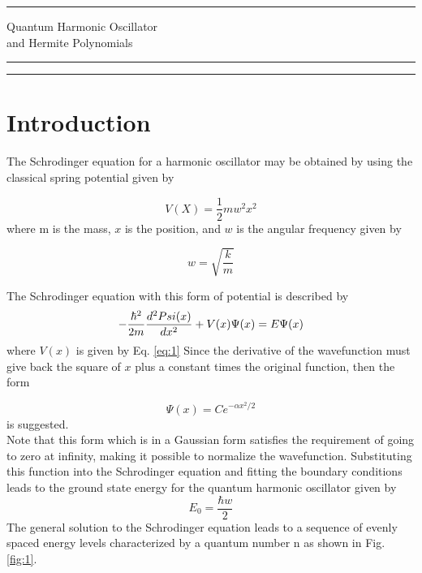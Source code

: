 \documentclass{article}
\begin{document}
\hrule
\begin{center}
\large {Quantum Harmonic Oscillator}\\ \large{and Hermite Polynomials}
\end{center}

\hrule
\vspace{1pt}
\hrule height 1pt

\section{Introduction}
The Schrodinger equation for a harmonic oscillator may be obtained by using the classical spring potential
given by

\begin{equation}
\label{eq:1}
V(X) = \frac{1}{2}mw^2x^2
\end{equation}
where m is the mass, $x$ is the position, and $w$ is the angular frequency given by

\begin{equation}
\label{eq:2}
w = \sqrt{\frac{k}{m}}
\end{equation}

\noindent
The Schrodinger equation with this form of potential is described by
\begin{equation}
\label{eq:3}
-\frac{\hbar^2}{2m} 
\frac{d^2\\Psi(x)}{dx^2} + V(x)\Psi(x) = E\Psi(x)
\end{equation}
where $V(x)$ is given by Eq. \eqref{eq:1} Since the derivative of the wavefunction must give back the square of $x$ plus
a constant times the original function, then the form

\begin{equation}
\label{eq:4}
\Psi(x) = C e^{-\alpha x^2 / 2}
\end{equation}
is suggested.\\

\noindent
Note that this form which is in a Gaussian form satisfies the requirement of going to zero at infinity, making
it possible to normalize the wavefunction. Substituting this function into the Schrodinger equation and
fitting the boundary conditions leads to the ground state energy for the quantum harmonic oscillator given
by
\begin{equation}
\label{eq:5}
E_{0} = \frac{\hbar w}{2}
\end{equation}
The general solution to the Schrodinger equation leads to a sequence of evenly spaced energy levels characterized
by a quantum number n as shown in Fig. \ref{fig:1}.\\
\end{document}
